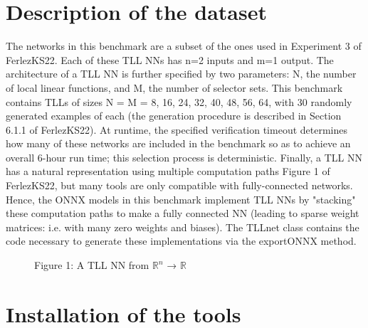\documentclass[12pt,a4paper]{report}
\newcommand\tab[1][5mm]{\hspace*{#1}}
\theoremstyle{definition}
\theoremstyle{remark}
\begin{document}
\chapter{Description of the dataset}
\tab The networks in this benchmark are a subset of the ones used in Experiment 3 of FerlezKS22\cite{tll_fast_algorithm}. Each of these TLL NNs has n=2 inputs and m=1 output. The architecture of a TLL NN is further specified by two parameters: N, the number of local linear functions, and M, the number of selector sets. This benchmark contains TLLs of sizes N = M = 8, 16, 24, 32, 40, 48, 56, 64, with 30 randomly generated examples of each (the generation procedure is described in Section 6.1.1 of FerlezKS22\cite{tll_fast_algorithm}). At runtime, the specified verification timeout determines how many of these networks are included in the benchmark so as to achieve an overall 6-hour run time; this selection process is deterministic. Finally, a TLL NN has a natural representation using multiple computation paths Figure 1 of FerlezKS22\cite{tll_fast_algorithm}, but many tools are only compatible with fully-connected networks. Hence, the ONNX models in this benchmark implement TLL NNs by "stacking" these computation paths to make a fully connected NN (leading to sparse weight matrices: i.e. with many zero weights and biases). The TLLnet\cite{tll_net} class contains the code necessary to generate these implementations via the exportONNX method.\cite{tll_git}

\begin{figure}[H]
\centering
{}
\caption{Figure 1: A TLL NN from \(\mathbb{R}^n\) → \(\mathbb{R}\)\cite{relu_architecture}}
\label{fig:relu_architecture}
\end{figure}
\chapter{Installation of the tools}
\end{document}
